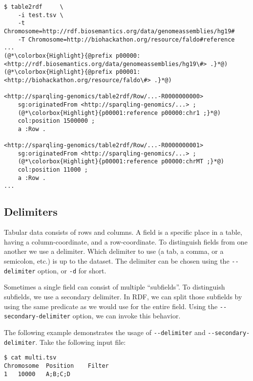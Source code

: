 \begin{siderules}
\begin{lstlisting}
$ table2rdf     \
    -i test.tsv \
    -t Chromosome=http://rdf.biosemantics.org/data/genomeassemblies/hg19#
    -T Chromosome=http://biohackathon.org/resource/faldo#reference
...
(@*\colorbox{Highlight}{@prefix p00000: <http://rdf.biosemantics.org/data/genomeassemblies/hg19\#> .}*@)
(@*\colorbox{Highlight}{@prefix p00001: <http://biohackathon.org/resource/faldo\#> .}*@)

<http://sparqling-genomics/table2rdf/Row/...-R0000000000>
    sg:originatedFrom <http://sparqling-genomics/...> ;
    (@*\colorbox{Highlight}{p00001:reference p00000:chr1 ;}*@)
    col:position 1500000 ;
    a :Row .

<http://sparqling-genomics/table2rdf/Row/...-R0000000001>
    sg:originatedFrom <http://sparqling-genomics/...> ;
    (@*\colorbox{Highlight}{p00001:reference p00000:chrMT ;}*@)
    col:position 11000 ;
    a :Row .
...
\end{lstlisting}
\end{siderules}

\subsection{Delimiters}

  Tabular data consists of rows and columns.  A field is a specific place in
  a table, having a column-coordinate, and a row-coordinate.  To distinguish
  fields from one another we use a delimiter.  Which delimiter to use (a tab,
  a comma, or a semicolon, etc.) is up to the dataset.  The delimiter
  can be chosen using the \texttt{-{}-delimiter} option, or \texttt{-d} for
  short.

  Sometimes a single field can consist of multiple ``subfields''.  To
  distinguish subfields, we use a secondary delimiter.  In RDF, we can split
  those subfields by using the same predicate as we would use for the entire
  field.  Using the \texttt{-{}-secondary-delimiter} option, we can invoke
  this behavior.

  The following example demonstrates the usage of \texttt{-{}-delimiter} and
  \texttt{-{}-secondary-delimiter}.  Take the following input file:
\begin{siderules}
\begin{verbatim}
$ cat multi.tsv
Chromosome	Position	Filter
1	10000	A;B;C;D
\end{verbatim}
\end{siderules}

